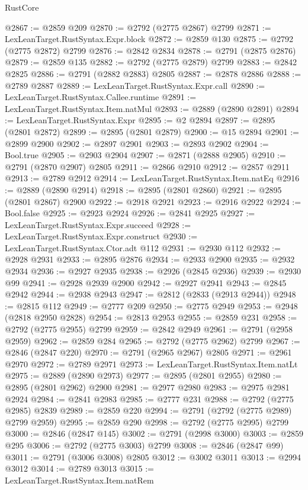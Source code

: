 \begin{lexlean}{RustCore}
\begin{coremodule}
@2867 := @2859 @209
@2870 := @2792 (@2775 @2867) @2799
@2871 := LexLeanTarget.RustSyntax.Expr.block
@2872 := @2859 @130
@2875 := @2792 (@2775 @2872) @2799
@2876 := @2842 @2834
@2878 := @2791 (@2875 @2876)
@2879 := @2859 @135
@2882 := @2792 (@2775 @2879) @2799
@2883 := @2842 @2825
@2886 := @2791 (@2882 @2883) @2805
@2887 := @2878 @2886
@2888 := @2789 @2887
@2889 := LexLeanTarget.RustSyntax.Expr.call
@2890 := LexLeanTarget.RustSyntax.Callee.runtime
@2891 := LexLeanTarget.RustSyntax.Item.natMul
@2893 := @2889 (@2890 @2891)
@2894 := LexLeanTarget.RustSyntax.Expr
@2895 := @2 @2894
@2897 := @2895 (@2801 @2872)
@2899 := @2895 (@2801 @2879)
@2900 := @15 @2894
@2901 := @2899 @2900
@2902 := @2897 @2901
@2903 := @2893 @2902
@2904 := Bool.true
@2905 := @2903 @2904
@2907 := @2871 (@2888 @2905)
@2910 := @2791 (@2870 @2907) @2805
@2911 := @2866 @2910
@2912 := @2857 @2911
@2913 := @2789 @2912
@2914 := LexLeanTarget.RustSyntax.Item.natEq
@2916 := @2889 (@2890 @2914)
@2918 := @2895 (@2801 @2860)
@2921 := @2895 (@2801 @2867) @2900
@2922 := @2918 @2921
@2923 := @2916 @2922
@2924 := Bool.false
@2925 := @2923 @2924
@2926 := @2841 @2925
@2927 := LexLeanTarget.RustSyntax.Expr.succeed
@2928 := LexLeanTarget.RustSyntax.Expr.construct
@2930 := LexLeanTarget.RustSyntax.Ctor.adt @112
@2931 := @2930 @112
@2932 := @2928 @2931
@2933 := @2895 @2876
@2934 := @2933 @2900
@2935 := @2932 @2934
@2936 := @2927 @2935
@2938 := @2926 (@2845 @2936)
@2939 := @2930 @99
@2941 := @2928 @2939 @2900
@2942 := @2927 @2941
@2943 := @2845 @2942
@2944 := @2938 @2943
@2947 := @2812 (@2833 (@2913 @2944))
@2948 := @2815 @112
@2949 := @2777 @209
@2950 := @2775 @2949
@2953 := @2948 (@2818 @2950 @2828)
@2954 := @2813 @2953
@2955 := @2859 @231
@2958 := @2792 (@2775 @2955) @2799
@2959 := @2842 @2949
@2961 := @2791 (@2958 @2959)
@2962 := @2859 @284
@2965 := @2792 (@2775 @2962) @2799
@2967 := @2846 (@2847 @220)
@2970 := @2791 (@2965 @2967) @2805
@2971 := @2961 @2970
@2972 := @2789 @2971
@2973 := LexLeanTarget.RustSyntax.Item.natLt
@2975 := @2889 (@2890 @2973)
@2977 := @2895 (@2801 @2955)
@2980 := @2895 (@2801 @2962) @2900
@2981 := @2977 @2980
@2983 := @2975 @2981 @2924
@2984 := @2841 @2983
@2985 := @2777 @231
@2988 := @2792 (@2775 @2985) @2839
@2989 := @2859 @220
@2994 := @2791 (@2792 (@2775 @2989) @2799 @2959)
@2995 := @2859 @290
@2998 := @2792 (@2775 @2995) @2799
@3000 := @2846 (@2847 @145)
@3002 := @2791 (@2998 @3000)
@3003 := @2859 @295
@3006 := @2792 (@2775 @3003) @2799
@3008 := @2846 (@2847 @99)
@3011 := @2791 (@3006 @3008) @2805
@3012 := @3002 @3011
@3013 := @2994 @3012
@3014 := @2789 @3013
@3015 := LexLeanTarget.RustSyntax.Item.natRem

\end{coremodule}
\end{lexlean}
